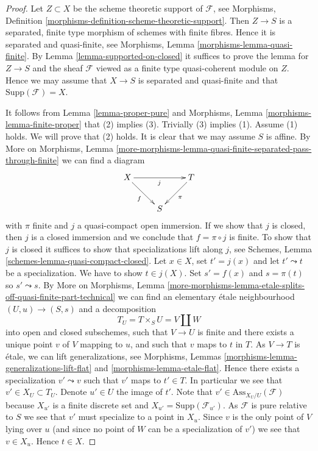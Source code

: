 \documentclass[10pt,a4paper]{amsart}
\theoremstyle{plain}
\theoremstyle{definition}
\theoremstyle{remark}
\numberwithin{equation}{subsection}
\begin{document}
\begin{proof}
Let $Z \subset X$ be the scheme theoretic support of $\mathcal{F}$, see
Morphisms, Definition \ref{morphisms-definition-scheme-theoretic-support}.
Then $Z \to S$ is a separated, finite type morphism of schemes with
finite fibres. Hence it is separated and quasi-finite, see
Morphisms, Lemma \ref{morphisms-lemma-quasi-finite}.
By
Lemma \ref{lemma-supported-on-closed}
it suffices to prove the lemma for $Z \to S$ and the sheaf $\mathcal{F}$
viewed as a finite type quasi-coherent module on $Z$. Hence we may
assume that $X \to S$ is separated and quasi-finite and that
$\text{Supp}(\mathcal{F}) = X$.

\medskip\noindent
It follows from
Lemma \ref{lemma-proper-pure}
and
Morphisms, Lemma \ref{morphisms-lemma-finite-proper}
that (2) implies (3). Trivially (3) implies (1). Assume (1) holds.
We will prove that (2) holds. It is clear that we may assume $S$ is affine. By
More on Morphisms,
Lemma \ref{more-morphisms-lemma-quasi-finite-separated-pass-through-finite}
we can find a diagram
$$
\xymatrix{
X \ar[rd]_f \ar[rr]_j & & T \ar[ld]^\pi \\
& S &
}
$$
with $\pi$ finite and $j$ a quasi-compact open immersion.
If we show that $j$ is closed, then $j$ is a closed immersion
and we conclude that $f = \pi \circ j$ is finite.
To show that $j$ is closed it suffices to show that specializations
lift along $j$, see
Schemes, Lemma \ref{schemes-lemma-quasi-compact-closed}.
Let $x \in X$, set $t' = j(x)$ and let $t' \leadsto t$ be a specialization.
We have to show $t \in j(X)$. Set $s' = f(x)$ and $s = \pi(t)$ so
$s' \leadsto s$. By
More on Morphisms, Lemma
\ref{more-morphisms-lemma-etale-splits-off-quasi-finite-part-technical}
we can find an elementary \'etale neighbourhood
$(U, u) \to (S, s)$ and a decomposition
$$
T_U = T \times_S U = V \amalg W
$$
into open and closed subschemes, such that $V \to U$ is finite and
there exists a unique point $v$ of $V$ mapping to $u$, and such that
$v$ maps to $t$ in $T$. As $V \to T$ is \'etale, we can lift
generalizations, see
Morphisms, Lemmas \ref{morphisms-lemma-generalizations-lift-flat} and
\ref{morphisms-lemma-etale-flat}.
Hence there exists a specialization $v' \leadsto v$ such that $v'$
maps to $t' \in T$. In particular we see that $v' \in X_U \subset T_U$.
Denote $u' \in U$ the image of $t'$. Note that
$v' \in \text{Ass}_{X_U/U}(\mathcal{F})$ because $X_{u'}$ is a finite
discrete set and $X_{u'} = \text{Supp}(\mathcal{F}_{u'})$.
As $\mathcal{F}$ is pure relative to $S$ we see that $v'$ must
specialize to a point in $X_u$. Since $v$ is the only point of
$V$ lying over $u$ (and since no point of $W$ can be a specialization
of $v'$) we see that $v \in X_u$. Hence $t \in X$.
\end{proof}
\end{document}
